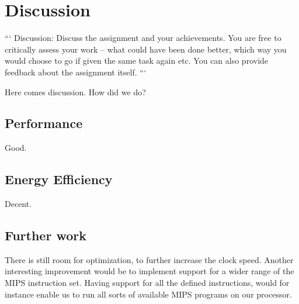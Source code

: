 \section{Discussion}

```
Discussion: Discuss the assignment and your achievements.
You are free to critically assess your work – what could have been done better, which way you would choose to go if given the same task again etc.
You can also provide feedback about the assignment itself.
```

Here comes discussion. How did we do?

\subsection{Performance}
Good.

\subsection{Energy Efficiency}
Decent.

\subsection{Further work}

There is still room for optimization, to further increase the clock speed.
Another interesting improvement would be to implement support for a wider range of the MIPS instruction set.
Having support for all the defined instructions, would for instance enable us to run all sorts of available MIPS programs on our processor.
